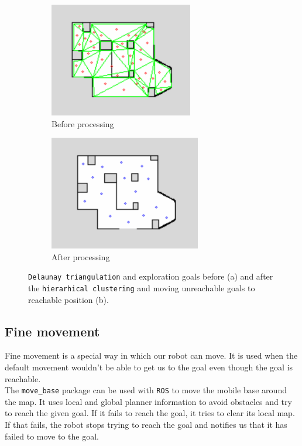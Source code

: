 \documentclass[12pt,a4paper]{article}
\begin{document}
	\begin{figure}[h]
		\begin{subfigure}{.5\textwidth}
			\centering
			\includegraphics[height=5cm]{images/before}
			\caption{Before processing}
			\label{fig:before_clustering}
		\end{subfigure}
		\begin{subfigure}{.5\textwidth}
			\centering
			\includegraphics[height=5cm]{images/after}
			\caption{After processing}
			\label{fig:after_clustering}
		\end{subfigure}
		\caption{\texttt{Delaunay triangulation} and exploration goals before (a) and after the \texttt{hierarhical clustering} and moving unreachable goals to reachable position (b).}
		\label{fig:exploration_goals}
	\end{figure}
	
	\subsection{Fine movement} \label{fine_movement}
	Fine movement is a special way in which our robot can move. It is used when the default movement wouldn't be able to get us to the goal even though the goal is reachable.  \\

	The \texttt{move\_base} package can be used with \texttt{ROS} to move the mobile base around the map. It uses local and global planner information to avoid obstacles and try to reach the given goal. If it fails to reach the goal, it tries to clear its local map. If that fails, the robot stops trying to reach the goal and notifies us that it has failed to move to the goal. \\
	
\end{document}
